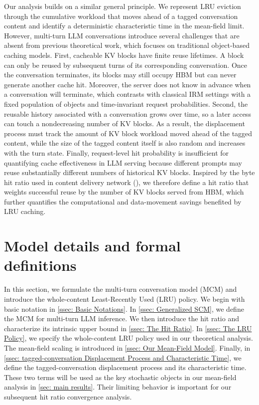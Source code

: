 \documentclass{article}
\theoremstyle{definition}
\begin{document}
Our analysis builds on a similar general principle. We represent LRU eviction through the cumulative workload that moves ahead of a tagged conversation content and identify a deterministic characteristic time in the mean-field limit. However, multi-turn LLM conversations introduce several challenges that are absent from previous theoretical work, which focuses on traditional object-based caching models. First, cacheable KV blocks have finite reuse lifetimes. A block can only be reused by subsequent turns of its corresponding conversation. Once the conversation terminates, its blocks may still occupy HBM but can never generate another cache hit. Moreover, the server does not know in advance when a conversation will terminate, which contrasts with classical IRM settings with a fixed population of objects and time-invariant request probabilities. Second, the reusable history associated with a conversation grows over time, so a later access can touch a nondecreasing number of KV blocks. As a result, the displacement process must track the amount of KV block workload moved ahead of the tagged content, while the size of the tagged content itself is also random and increases with the turn state. Finally, request-level hit probability is insufficient for quantifying cache effectiveness in LLM serving because different prompts may reuse substantially different numbers of historical KV blocks. Inspired by the byte hit ratio used in content delivery network (\cite{berger2017adaptsize}), we therefore define a hit ratio that weights successful reuse by the number of KV blocks served from HBM, which further quantifies the computational and data-movement savings benefited by LRU caching.



\section{Model details and formal definitions}
\label{sec: Model Settings}

In this section, we formulate the multi-turn conversation model (MCM) and introduce the whole-content Least-Recently Used (LRU) policy. We begin with basic notation in \cref{ssec: Basic Notations}. In \cref{ssec: Generalized SCM}, we define the MCM for multi-turn LLM inference. We then introduce the  hit ratio and characterize its intrinsic upper bound in \cref{ssec: The  Hit Ratio}. In \cref{ssec: The LRU Policy}, we specify the whole-content LRU policy used in our theoretical analysis. The mean-field scaling is introduced in \cref{ssec: Our Mean-Field Model}. Finally, in \cref{ssec: tagged-conversation Displacement Process and Characteristic Time}, we define the tagged-conversation displacement process and its characteristic time. These two terms will be used as the key stochastic objects in our mean-field analysis in \cref{sec: main results}. Their limiting behavior is important for our subsequent hit ratio convergence analysis.
\end{document}
